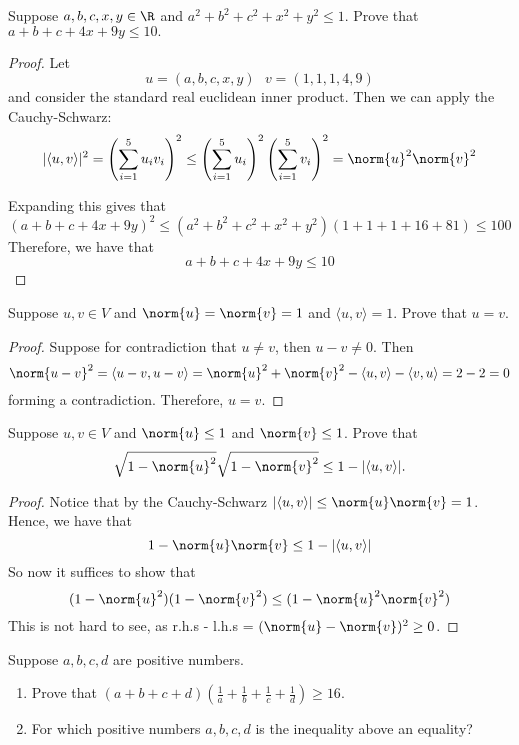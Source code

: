 \documentclass{extarticle}
\begin{document}
\begin{problem}{8}
    Suppose \(a,b,c,x,y \in \R\) and \(a^2 + b^2 + c^2 + x^2 + y^2 \leq 1\). Prove that 
    \(a + b + c + 4x + 9y \leq 10.\)
\end{problem}

\begin{proof}
Let 
\[u = (a, b, c, x, y) \ \ \ v = (1, 1, 1, 4, 9)\]
and consider the standard real euclidean inner product. Then we can apply the Cauchy-Schwarz:
\[|\langle u,v \rangle|^2 = \left(\sum_{i=1}^{5}u_i v_i \right)^2 \leq \left(\sum_{i=1}^{5} u_i\right)^2 \left(\sum_{i=1}^{5}v_i\right)^2 = \norm{u}^2 \norm{v}^2\]

Expanding this gives that 
\[(a + b + c + 4x + 9y)^2 \leq (a^2+b^2+c^2+x^2+y^2)(1+1+1+16+81) \leq 100\] 
Therefore, we have that 
\[a + b + c + 4x + 9y \leq 10\]
\end{proof}

\begin{problem}{9}
    Suppose \(u, v \in V\) and \(\norm{u} = \norm{v} = 1\) and \(\langle u,v \rangle = 1\). Prove 
    that \(u = v\).
\end{problem}

\begin{proof}
Suppose for contradiction that \(u \neq v\), then \(u - v \neq 0\). Then 
\[\norm{u - v}^2 = \langle u-v,u-v \rangle = \norm{u}^2 + \norm{v}^2 - \langle u,v \rangle 
- \langle v,u \rangle= 2 - 2 = 0\]
forming a contradiction. Therefore, \(u = v\).
\end{proof}

\begin{problem}{10}
    Suppose \(u, v \in V\) and \(\norm{u} \leq 1\) and \(\norm{v} \leq 1\). Prove that 
    \[\sqrt{1 - \norm{u}^2} \sqrt{1 - \norm{v}^2} \leq 1 - |\langle u,v \rangle|.\]
\end{problem}

\begin{proof}
Notice that by the Cauchy-Schwarz \( |\langle u,v \rangle| \leq \norm{u}\norm{v} = 1\). Hence, we have that 
\[1 - \norm{u} \norm{v} \leq 1 - |\langle u,v \rangle|\]
So now it suffices to show that 
\[(1 - \norm{u}^2)(1 - \norm{v}^2) \leq (1 - \norm{u}^2 \norm{v}^2)\]
This is not hard to see, as r.h.s - l.h.s = \((\norm{u} - \norm{v})^2 \geq 0\).
\end{proof}

\begin{problem}{12}
    Suppose \(a,b,c,d\) are positive numbers. 
    \begin{enumerate}[label=(\alph*)]
        \item Prove that \((a+b+c+d)(\frac{1}{a} + \frac{1}{b} + \frac{1}{c} + \frac{1}{d}) \geq 16\). 
        \item For which positive numbers \(a,b,c,d\) is the inequality above an equality?
    \end{enumerate}
\end{problem}
\end{document}
